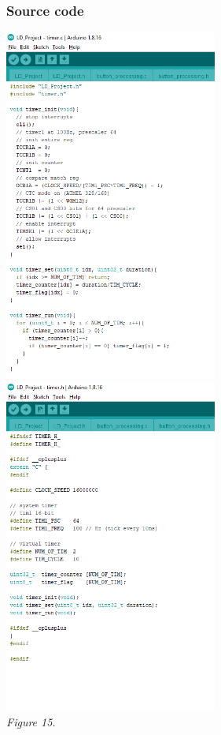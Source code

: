 \documentclass[a4paper]{article}
\begin{document}
\subsubsection{Source code}
\medskip
\begin{center}
    \includegraphics[width=7cm]{pictures/12.png}
    \includegraphics[width=7cm]{pictures/13.png}\\
    \textit{Figure 15.}\\
\end{center}
\medskip
\end{document}
